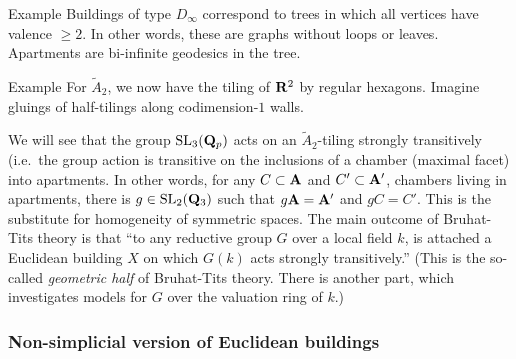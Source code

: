 \begin{enonce}[remark]{Example}
Buildings of type $D_\infty$ correspond to trees in which all vertices have
valence $\geqslant 2$. In other words, these are graphs without loops or 
leaves. Apartments are bi-infinite geodesics in the tree. 
\end{enonce}

\begin{enonce}[remark]{Example}
For $\widetilde A_2$, we now have the tiling of $\mathbf{R}^2$ by regular hexagons. 
Imagine gluings of half-tilings along codimension-$1$ walls. 
\end{enonce}

We will see that the group $\operatorname{SL}_3(\mathbf{Q}_p)$ acts on an 
$\widetilde A_2$-tiling strongly transitively (i.e.\ the group action is 
transitive on the inclusions of a chamber (maximal facet) into 
apartments. In other words, for any $C\subset\mathbf{A}$ and $C'\subset \mathbf{A}'$, 
chambers living in apartments, there is $g\in \operatorname{SL}_2(\mathbf{Q}_3)$ such 
that $g \mathbf{A}=\mathbf{A}'$ and $g C=C'$. This is the substitute for homogeneity of 
symmetric spaces. The main outcome of Bruhat-Tits theory is that ``to any 
reductive group $G$ over a local field $k$, is attached a Euclidean building 
$X$ on which $G(k)$ acts strongly transitively.'' (This is the so-called 
\emph{geometric half} of Bruhat-Tits theory. There is another part, which 
investigates models for $G$ over the valuation ring of $k$.) 


\subsubsection{Non-simplicial version of Euclidean buildings}

